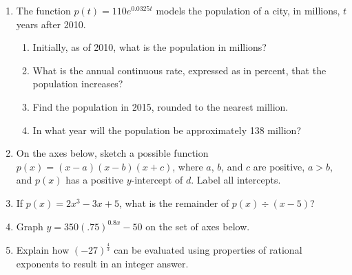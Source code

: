 \documentclass[12pt, oneside]{article}
\begin{document}
\begin{enumerate}
\item The function $p(t)=110e^{0.0325t}$ models the population of a city, in millions, $t$ years after 2010.
\begin{enumerate}
    \item Initially, as of 2010, what is the population in millions?\\[40pt]
    \item What is the annual continuous rate, expressed as in percent, that the population increases?\\[40pt]
    \item Find the population in 2015, rounded to the nearest million.\\[80pt]
    \item In what year will the population be approximately 138 million?
\end{enumerate}

\newpage

\item On the axes below, sketch a possible function $p(x) = (x  -a)(x - b)(x + c)$, where $a$, $b$, and $c$ are positive, $a  >b$, and $p(x)$ has a positive $y$-intercept of $d$. Label all intercepts. 
\begin{center}
\end{center} %

\item If $p(x)=2x^3-3x+5$, what is the remainder of $p(x) \div (x-5)$?%

\newpage

\item Graph $y=350(.75)^{0.8x}-50$ on the set of axes below.
\begin{center}
\end{center} %



\item Explain how $\displaystyle (-27)^\frac{4}{3}$ can be evaluated using properties of rational exponents to result in an integer answer.

\end{enumerate}
\end{document}
